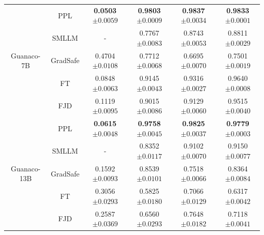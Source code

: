 \documentclass{article}
\begin{document}
\begin{table}[t]
\begin{tabular}{cccccc}
    \midrule
    \multirow{5}{*}{Guanaco-7B} 
    & PPL  & \textbf{0.0503}\tiny{$\pm 0.0059$} & \textbf{0.9803}\tiny{$\pm 0.0009$} & \textbf{0.9837}\tiny{$\pm 0.0034$} & \textbf{0.9833}\tiny{$\pm 0.0001$}  \\
    & SMLLM & - & 0.7767\tiny{$\pm 0.0083$} & 0.8743\tiny{$\pm 0.0053$} & 0.8811\tiny{$\pm 0.0029$}  \\
    & GradSafe & 0.4704\tiny{$\pm 0.0108$} & 0.7712\tiny{$\pm 0.0068$} & 0.6695\tiny{$\pm 0.0070$} & 0.7501\tiny{$\pm 0.0019$}  \\
    & FT & 0.0848\tiny{$\pm 0.0063$} & 0.9145\tiny{$\pm 0.0043$} & 0.9316\tiny{$\pm 0.0027$} & 0.9640\tiny{$\pm 0.0008$}  \\
    & FJD & 0.1119\tiny{$\pm 0.0095$} & 0.9015\tiny{$\pm 0.0086$} & 0.9129\tiny{$\pm 0.0060$} & 0.9515\tiny{$\pm 0.0040$}  \\
    \midrule
    \multirow{5}{*}{Guanaco-13B} 
    & PPL & \textbf{0.0615}\tiny{$\pm 0.0048$} & \textbf{0.9758}\tiny{$\pm 0.0045$} & \textbf{0.9825}\tiny{$\pm 0.0037$} & \textbf{0.9779}\tiny{$\pm 0.0003$}  \\
    & SMLLM & - & 0.8352\tiny{$\pm 0.0117$} & 0.9102\tiny{$\pm 0.0070$} & 0.9150\tiny{$\pm 0.0077$}  \\
    & GradSafe & 0.1592\tiny{$\pm 0.0093$} & 0.8539\tiny{$\pm 0.0101$} & 0.7518\tiny{$\pm 0.0066$} & 0.8364\tiny{$\pm 0.0084$}  \\
    & FT & 0.3056\tiny{$\pm 0.0293$} & 0.5825\tiny{$\pm 0.0180$} & 0.7066\tiny{$\pm 0.0129$} & 0.6317\tiny{$\pm 0.0042$}   \\
    & FJD & 0.2587\tiny{$\pm 0.0369$} & 0.6560\tiny{$\pm 0.0293$} & 0.7648\tiny{$\pm 0.0182$} & 0.7118\tiny{$\pm 0.0041$}  \\

    \bottomrule
  \end{tabular} 

\end{table}
\end{document}
